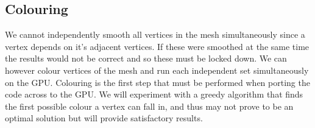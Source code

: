 \subsection*{Colouring}
We cannot independently smooth all vertices in the mesh simultaneously since a vertex depends on it's adjacent vertices. If these were smoothed at the same time the results would not be correct and so these must be locked down. We can however colour vertices of the mesh and run each independent set simultaneously on the GPU.
Colouring is the first step that must be performed when porting the code across to the GPU.
We will experiment with a greedy algorithm that finds the first possible colour a vertex can fall in, and thus may not prove to be an optimal solution but will provide satisfactory results.

